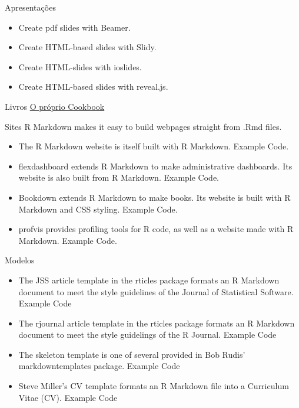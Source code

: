\documentclass[
  9pt,
  ignorenonframetext,
]{beamer}
\begin{document}
\begin{frame}{Apresentações}
\protect\hypertarget{apresentauxe7uxf5es}{}
\begin{itemize}
\item
  Create pdf slides with Beamer.
\item
  Create HTML-based slides with Slidy.
\item
  Create HTML-slides with ioslides.
\item
  Create HTML-based slides with reveal.js.
\end{itemize}
\end{frame}

\begin{frame}{Livros}
\protect\hypertarget{livros}{}
\href{https://bookdown.org/yihui/rmarkdown-cookbook/}{O próprio
Cookbook}
\end{frame}

\begin{frame}{Sites}
\protect\hypertarget{sites}{}
R Markdown makes it easy to build webpages straight from .Rmd files.

\begin{itemize}
\item
  The R Markdown website is itself built with R Markdown. Example Code.
\item
  flexdashboard extends R Markdown to make administrative dashboards.
  Its website is also built from R Markdown. Example Code.
\item
  Bookdown extends R Markdown to make books. Its website is built with R
  Markdown and CSS styling. Example Code.
\item
  profvis provides profiling tools for R code, as well as a website made
  with R Markdown. Example Code.
\end{itemize}
\end{frame}

\begin{frame}{Modelos}
\protect\hypertarget{modelos}{}
\begin{itemize}
\item
  The JSS article template in the rticles package formats an R Markdown
  document to meet the style guidelines of the Journal of Statistical
  Software. Example Code
\item
  The rjournal article template in the rticles package formats an R
  Markdown document to meet the style guidelings of the R Journal.
  Example Code
\item
  The skeleton template is one of several provided in Bob Rudis'
  markdowntemplates package. Example Code
\item
  Steve Miller's CV template formats an R Markdown file into a
  Curriculum Vitae (CV). Example Code
\end{itemize}
\end{frame}
\end{document}
